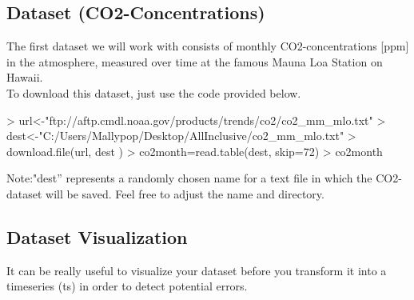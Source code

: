 \documentclass[11pt, a4paper]{article} %
\begin{document}
\subsection{Dataset (CO2-Concentrations)}%
The first dataset we will work with consists of monthly CO2-concentrations [ppm] in the atmosphere, measured over time at the famous Mauna Loa Station on Hawaii.\\
To download this dataset, just use the code provided below.
\begin{Schunk}
\begin{Sinput}
> url<-"ftp://aftp.cmdl.noaa.gov/products/trends/co2/co2_mm_mlo.txt"
> dest<-"C:/Users/Mallypop/Desktop/AllInclusive/co2_mm_mlo.txt"
> download.file(url, dest )
> co2month=read.table(dest, skip=72)
> co2month
\end{Sinput}
\end{Schunk}
\noindent Note:"dest'' represents a randomly chosen name for a text file in which the CO2-dataset will be saved. Feel free to adjust the name and directory.
\subsection{Dataset Visualization}%
It can be really useful to visualize your dataset before you transform it into a timeseries (ts) in order to detect potential errors.
\end{document}
